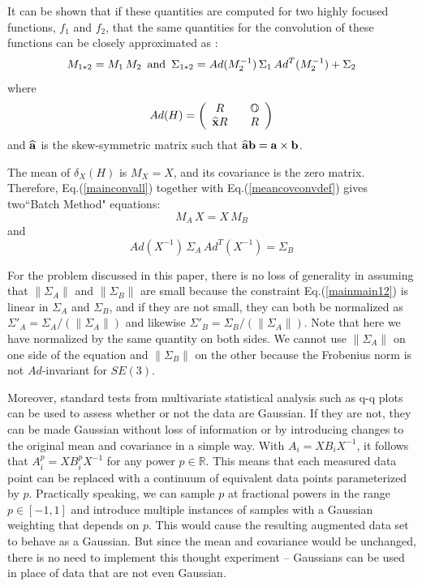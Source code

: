 \documentclass[twocolumn,10pt]{asme2ej}
\begin{document}
It can be shown that if these quantities are computed for two highly focused functions, $f_1$ and $f_2$, that the same quantities for
the convolution of these functions can be closely approximated as \cite{Wang08}:
\begin{equation}
M_{1*2} = M_1 \, M_2 \,\,\, {\rm and} \,\,\, \Sigma_{1*2} = Ad(M_2^{-1}) \,\Sigma_{1}\, Ad^T(M_2^{-1}) + \Sigma_{2}
\label{meancovconvdef} \end{equation}
where
\begin{equation} 
Ad(H) = \left(\begin{array}{ccc}
R && \mathbb{O} \\
\widehat{{\bf x}} R && R \end{array}\right) 
\label{adjdef} \end{equation}
and $\widehat{{\bf a}}$ is the skew-symmetric matrix such that $\widehat{{\bf a}} {\bf b} = {\bf a} \times {\bf b}$.

The mean of $\delta_X(H)$ is $M_X = X$, and its covariance is the zero matrix.
Therefore, Eq.(\ref{mainconvall}) together with Eq.(\ref{meancovconvdef}) gives two``Batch Method" equations:
\begin{equation}
\boxed{\,
M_A \, X = X \, M_B
\,}
\label{mainmain11} \end{equation}
and
\begin{equation}
\boxed{\,
Ad(X^{-1}) \, \Sigma_{A} \, Ad^T(X^{-1}) = \Sigma_{B}
\,}
\label{mainmain12} \end{equation}

For the problem discussed in this paper, there is no loss of generality in assuming that $\|\Sigma_A\|$ and $\|\Sigma_B\|$
are small because the constraint Eq.(\ref{mainmain12}) is linear
in $\Sigma_A$ and $\Sigma_B$, and if they are not small, they can both be normalized as $\Sigma'_A = \Sigma_A/(\|\Sigma_A\|) $ and likewise
$\Sigma'_B = \Sigma_B/(\|\Sigma_A\|)$. Note that here we have normalized by the same quantity on both sides. We cannot use $\|\Sigma_A\|$ on one side
of the equation and $\|\Sigma_B\|$ on the other because the Frobenius norm is not $Ad$-invariant for $SE(3)$.

Moreover, standard tests from multivariate statistical analysis such as q-q plots can be used to assess whether or not the data are
Gaussian. If they are not, they can be made Gaussian without loss of information or by introducing changes to the original mean and covariance in a simple way.
With $A_i = X B_i X^{-1}$, it follows that $A_i^p = X B_i^p X^{-1}$ for any power $p \in \mathbb{R}$. This means that each measured data point can be
replaced with a continuum of equivalent data points parameterized by $p$. Practically speaking, we can sample $p$ at fractional powers in the range
$p\in [-1,1]$ and introduce multiple instances of samples with a Gaussian weighting that depends on $p$. This would cause the resulting augmented data set
to behave as a Gaussian. But since the mean and covariance would be unchanged, there is no need to implement this thought experiment -- Gaussians can be
used in place of data that are not even Gaussian.
\end{document}
